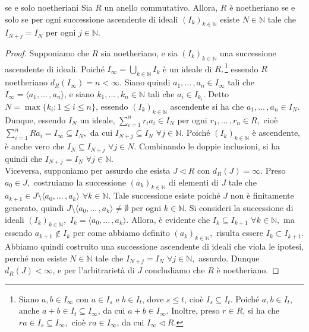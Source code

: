 \begin{prop}[]{se e solo noetheriani}
  Sia $R$ un anello commutativo. Allora, $R$ è noetheriano se e solo se per ogni successione ascendente di ideali $(I_k)_{k\in \mathbb{N}}$ 
  esiste $N\in\mathbb{N}$ tale che $I_{N+j}=I_N$ per ogni $j\in\mathbb{N}.$
\end{prop}
\vspace{-4mm}
\begin{proof}
  Supponiamo che $R$ sia noetheriano, e sia $(I_k)_{k\in \mathbb{N}}$ una successione ascendente di ideali. 
  Poiché $I_{\infty}=\bigcup\limits_{k\in \mathbb{N}} I_k$ è un ideale di $R,$\footnote{Siano $a,b\in I_{\infty}$ 
  con $a\in I_{s}$ e $b\in I_{t}$, dove $s\leq t$, cioè $I_s\subseteq I_t$. Poiché $a,b\in I_t$, anche $a+b\in I_t\subseteq I_{\infty}$, 
  da cui $a+b\in I_{\infty}$. Inoltre, preso $r\in R$, si ha che $ra\in I_s\subseteq I_{\infty},$ cioè $ra\in I_{\infty}$, da cui $I_{\infty}\lhd R$.} 
  essendo $R$ noetheriano $d_R(I_{\infty})=n<\infty.$ Siano quindi $a_1,...\,,a_n\in I_{\infty}$ tali che $I_{\infty}=\langle a_1,...\,,a_n \rangle$, 
  e siano $k_1,...\,,k_n\in \mathbb{N}$ tali che $a_i\in I_{k_i}$. Detto $N=\max\{k_i : 1\leq i\leq n\}$, 
  essendo $(I_k)_{k\in \mathbb{N}}$ ascendente si ha che $a_1,...\,,a_n\in I_N.$ Dunque, essendo $I_N$ un ideale, 
  $\sum\limits_{i=1}^n r_ia_i\in I_N$ per ogni $r_1,...\,,r_n\in R,$ cioè $\sum\limits_{i=1}^n Ra_i=I_{\infty}\subseteq I_N,$ 
  da cui $I_{N+j}\subseteq I_N$ $\forall j\in \mathbb{N}.$ Poiché $(I_k)_{k\in \mathbb{N}}$ è ascendente, è anche vero che 
  $I_N\subseteq I_{N+j}$ $\forall j\in N$. Combinando le doppie inclusioni, si ha quindi che $I_{N+j}=I_N$ $\forall j\in \mathbb{N}.$\\

  \noindent Viceversa, supponiamo per assurdo che esista $J\lhd R$ con $d_R(J)=\infty.$ Preso $a_0\in J,$ costruiamo la successione 
  $(a_k)_{k\in \mathbb{N}}$ di elementi di $J$ tale che $a_{k+1}\in J\setminus \langle a_0,...\,,a_k\rangle$ $\forall k\in \mathbb{N}.$ 
  Tale successione esiste poiché $J$ non è finitamente generato, quindi $J\setminus \langle a_0,...\,,a_k\rangle \neq \emptyset$ 
  per ogni $k\in \mathbb{N}.$ Si consideri la successione di ideali $(I_k)_{k\in \mathbb{N}},$ $I_k=\langle a_0,...\,,a_k\rangle.$ 
  Allora, è evidente che $I_k\subseteq I_{k+1}$ $\forall k\in \mathbb{N},$ ma essendo $a_{k+1}\not\in I_{k}$ per come abbiamo definito 
  $(a_k)_{k\in \mathbb{N}},$ risulta essere $I_k\subset I_{k+1}.$ Abbiamo quindi costruito una successione ascendente di ideali che viola le ipotesi, 
  perché non esiste $N\in \mathbb{N}$ tale che $I_{N+j}=I_{N}$ $\forall j\in \mathbb{N},$ assurdo. Dunque $d_R(J)<\infty$, 
  e per l'arbitrarietà di $J$ concludiamo che $R$ è noetheriano.
\end{proof}

